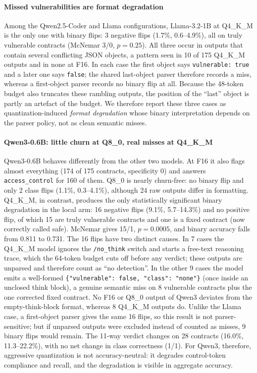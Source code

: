 \paragraph{Missed vulnerabilities are format degradation}
Among the Qwen2.5-Coder and Llama configurations, Llama-3.2-1B at Q4\_K\_M is the only one with binary flips: 3 negative flips (1.7\%, 0.6--4.9\%), all on truly vulnerable contracts (McNemar 3/0, $p=0.25$). All three occur in outputs that contain several conflicting JSON objects, a pattern seen in 10 of 175 Q4\_K\_M outputs and in none at F16. In each case the first object says \texttt{vulnerable: true} and a later one says \texttt{false}; the shared last-object parser therefore records a miss, whereas a first-object parser records no binary flip at all. Because the 48-token budget also truncates these rambling outputs, the position of the ``last'' object is partly an artefact of the budget. We therefore report these three cases as quantization-induced \emph{format degradation} whose binary interpretation depends on the parser policy, not as clean semantic misses.

\paragraph{Qwen3-0.6B: little churn at Q8\_0, real misses at Q4\_K\_M}
Qwen3-0.6B behaves differently from the other two models. At F16 it also flags almost everything (174 of 175 contracts, specificity 0) and answers \texttt{access\_control} for 160 of them. Q8\_0 is nearly churn-free: no binary flip and only 2 class flips (1.1\%, 0.3--4.1\%), although 24 raw outputs differ in formatting. Q4\_K\_M, in contrast, produces the only statistically significant binary degradation in the local arm: 16 negative flips (9.1\%, 5.7--14.3\%) and no positive flip, of which 15 are truly vulnerable contracts and one is a fixed contract (now correctly called safe). McNemar gives 15/1, $p=0.0005$, and binary accuracy falls from 0.811 to 0.731. The 16 flips have two distinct causes. In 7 cases the Q4\_K\_M model ignores the \texttt{/no\_think} switch and starts a free-text reasoning trace, which the 64-token budget cuts off before any verdict; these outputs are unparsed and therefore count as ``no detection''. In the other 9 cases the model emits a well-formed \texttt{\{"vulnerable": false, "class": "none"\}} (once inside an unclosed think block), a genuine semantic miss on 8 vulnerable contracts plus the one corrected fixed contract. No F16 or Q8\_0 output of Qwen3 deviates from the empty-think-block format, whereas 8 Q4\_K\_M outputs do. Unlike the Llama case, a first-object parser gives the same 16 flips, so this result is not parser-sensitive; but if unparsed outputs were excluded instead of counted as misses, 9 binary flips would remain. The 11-way verdict changes on 28 contracts (16.0\%, 11.3--22.2\%), with no net change in class correctness (1/1). For Qwen3, therefore, aggressive quantization is not accuracy-neutral: it degrades control-token compliance and recall, and the degradation is visible in aggregate accuracy.

